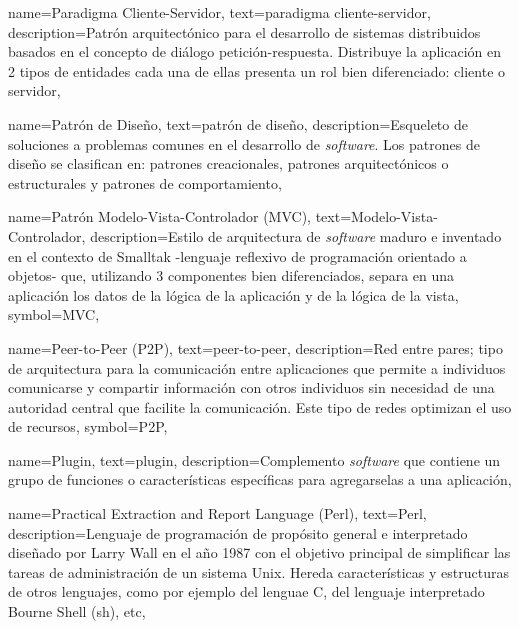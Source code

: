 {
    name={Paradigma Cliente-Servidor},
    text={paradigma cliente-servidor},
    description={Patrón arquitectónico para el desarrollo de sistemas distribuidos basados en el concepto de diálogo petición-respuesta. Distribuye la aplicación en 2 tipos de entidades cada una de ellas presenta un rol bien diferenciado: cliente o servidor},
}	

{
    name={Patrón de Diseño},
    text={patrón de diseño},
    description={Esqueleto de soluciones a problemas comunes en el desarrollo de \textit{software}. Los patrones de diseño se clasifican en: patrones creacionales, patrones arquitectónicos o estructurales y patrones de comportamiento},
}	
	
{
    name={Patrón Modelo-Vista-Controlador (MVC)},
    text={Modelo-Vista-Controlador},
    description={Estilo de arquitectura de \textit{software} maduro e inventado en el contexto de Smalltak -lenguaje reflexivo de programación orientado a objetos- que, utilizando 3 componentes bien diferenciados, separa en una aplicación los datos de la lógica de la aplicación y de la lógica de la vista},
    symbol={MVC},
}

{
    name={Peer-to-Peer (P2P)},
    text={peer-to-peer},
    description={Red entre pares; tipo de arquitectura para la comunicación entre aplicaciones que permite a individuos comunicarse y compartir información con otros individuos sin necesidad de una autoridad central que facilite la comunicación. Este tipo de redes optimizan el uso de recursos},
    symbol={P2P},
}

{
    name={Plugin},
    text={plugin},
    description={Complemento \textit{software} que contiene un grupo de funciones o características específicas para agregarselas a una aplicación},
}

{
    name={Practical Extraction and Report Language (Perl)},
    text={Perl},
    description={Lenguaje de programación de propósito general e interpretado diseñado por Larry Wall en el año 1987 con el objetivo principal de simplificar las tareas de administración de un sistema Unix. Hereda características y estructuras de otros lenguajes, como por ejemplo del lenguae C, del lenguaje interpretado Bourne Shell (sh), etc},
}

